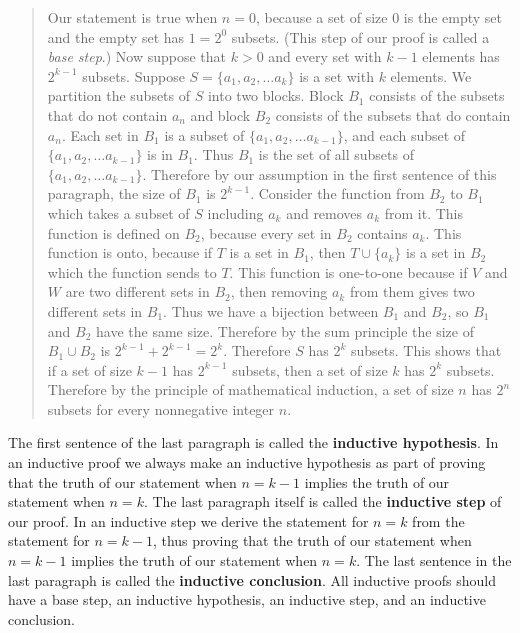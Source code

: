 \documentclass[10pt,]{book}
\newcommand{\terminology}[1]{\textbf{#1}}
\theoremstyle{plain}
\theoremstyle{definition}
\theoremstyle{definition}
\numberwithin{equation}{chapter}
\begin{document}
\begin{quote}\hypertarget{blockquote-7}{}
Our statement is true when \(n=0\), because a set of size 0 is the empty set and the empty set has \(1=2^0\) subsets. (This step of our proof is called a \emph{base step}.) Now suppose that \(k>0\) and every set with \(k-1\) elements has \(2^{k-1}\) subsets.  Suppose \(S=\{a_1,a_2,\ldots a_k\}\) is a set with \(k\) elements. We partition the subsets of \(S\) into two blocks.  Block \(B_1\) consists of the subsets that do not contain \(a_n\) and block \(B_2\) consists of the subsets that do contain \(a_n\).  Each set in \(B_1\) is a subset of \(\{a_1,a_2,\ldots a_{k-1}\}\), and each subset of \(\{a_1,a_2, \ldots
a_{k-1}\}\) is in \(B_1\).  Thus \(B_1\) is the set of all subsets of \(\{a_1,a_2,\ldots a_{k-1}\}\).  Therefore by our assumption in the first sentence of this paragraph, the size of \(B_1\) is \(2^{k-1}\).  Consider the function from \(B_2\) to \(B_1\) which takes a subset of \(S\) including \(a_k\) and removes \(a_k\) from it.  This function is defined on \(B_2\), because every set in \(B_2\) contains \(a_k\).  This function is onto, because if \(T\) is a set in \(B_1\), then \(T\cup \{a_k\}\) is a set in \(B_2\) which the function sends to \(T\).  This function is one-to-one because if \(V\) and \(W\) are two different sets in \(B_2\), then removing \(a_k\) from them gives two different sets in \(B_1\).  Thus we have a bijection between \(B_1\) and \(B_2\), so \(B_1\) and \(B_2\) have the same size.  Therefore by the sum principle the size of \(B_1\cup B_2\) is \(2^{k-1} +2^{k-1}=2^k\).  Therefore \(S\) has \(2^k\) subsets.  This shows that if a set of size \(k-1\) has \(2^{k-1}\) subsets, then a set of size \(k\) has \(2^k\) subsets.  Therefore by the principle of mathematical induction, a set of size \(n\) has \(2^n\) subsets for every nonnegative integer \(n\).%
\end{quote}
The first sentence of the last paragraph is called the \terminology{inductive hypothesis}. In an inductive proof we always make an inductive hypothesis as part of proving that the truth of our statement when \(n=k-1\) implies the truth of our statement when \(n=k\). The last paragraph itself is called the \terminology{inductive step} of our proof. In an inductive step we derive the statement for \(n=k\) from the statement for \(n=k-1\), thus proving that the truth of our statement when \(n=k-1\) implies the truth of our statement when \(n=k\). The last sentence in the last paragraph is called the \terminology{inductive conclusion}. All inductive proofs should have a base step, an inductive hypothesis, an inductive step, and an inductive conclusion.%
\end{document}
